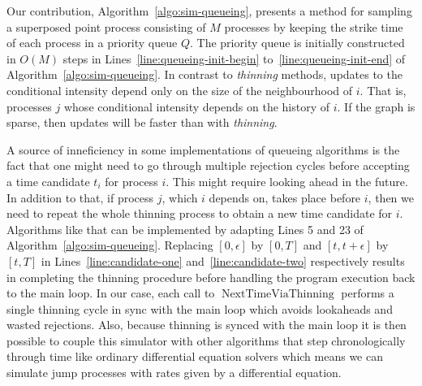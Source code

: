 \documentclass{juliacon}
\begin{document}
Our contribution, Algorithm~\ref{algo:sim-queueing}, presents a method for sampling a superposed point process consisting of \( M \) processes by keeping the strike time of each process in a priority queue \( Q \). The priority queue is initially constructed in \( O(M) \) steps in Lines~\ref{line:queueing-init-begin} to~\ref{line:queueing-init-end} of Algorithm~\ref{algo:sim-queueing}. In contrast to \textit{thinning} methods, updates to the conditional intensity depend only on the size of the neighbourhood of \( i \). That is, processes \( j \) whose conditional intensity depends on the history of \( i \). If the graph is sparse, then updates will be faster than with \textit{thinning}. 

A source of inneficiency in some implementations of queueing algorithms is the fact that one might need to go through multiple rejection cycles before accepting a time candidate \( t_i \) for process \( i \). This might require looking ahead in the future. In addition to that, if process \( j \), which \( i \) depends on, takes place before \( i \), then we need to repeat the whole thinning process to obtain a new time candidate for \( i \). Algorithms like that can be implemented by adapting Lines 5 and 23 of Algorithm~\ref{algo:sim-queueing}. Replacing \( [0, \epsilon] \) by \( [0, T] \) and \( [t, t + \epsilon] \) by \( [t, T] \) in Lines~\ref{line:candidate-one} and~\ref{line:candidate-two} respectively results in completing the thinning procedure before handling the program execution back to the main loop. In our case, each call to \( \operatorname{NextTimeViaThinning} \) performs a single thinning cycle in sync with the main loop which avoids lookaheads and wasted rejections. Also, because thinning is synced with the main loop it is then possible to couple this simulator with other algorithms that step chronologically through time like ordinary differential equation solvers which means we can simulate jump processes with rates given by a differential equation.
\end{document}
